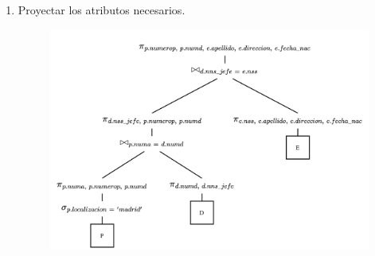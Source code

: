 \documentclass{templateNote}
\begin{document}
\begin{enumerate}
\begin{itemize}
\begin{enumerate}
            \item Proyectar los atributos necesarios.
            \begin{figure}[H]
                \centering
                \includegraphics[width=\textwidth]{img/E4-Paso-6.png}
            \end{figure}
        \end{enumerate}
    \end{itemize}
\end{enumerate}

\newpage
\end{document}
